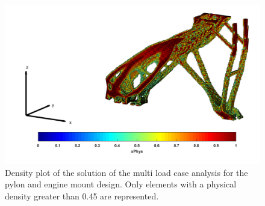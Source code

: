        \begin{figure}[ht]
        \centering
        \includegraphics[width=\textwidth]{images/Ch2/Density_plot_000}
        \caption{Density plot of the solution of the multi load case analysis for the pylon and engine mount design. Only elements with a physical density greater than 0.45 are represented.}
        \label{fig.2.27}
        \end{figure}
